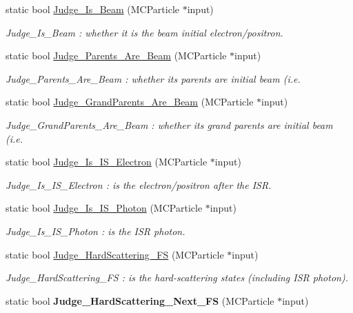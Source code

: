 \begin{DoxyCompactItemize}
\item 
static bool \hyperlink{classToolSet_1_1CMC_aa63f12865d46af350674c7dca3eb5437}{Judge\_\-Is\_\-Beam} (MCParticle $\ast$input)
\begin{DoxyCompactList}\small\item\em Judge\_\-Is\_\-Beam : whether it is the beam initial electron/positron. \item\end{DoxyCompactList}\item 
static bool \hyperlink{classToolSet_1_1CMC_a5ccf3aedd3c942ac6644748abaaf70fe}{Judge\_\-Parents\_\-Are\_\-Beam} (MCParticle $\ast$input)
\begin{DoxyCompactList}\small\item\em Judge\_\-Parents\_\-Are\_\-Beam : whether its parents are initial beam (i.e. \item\end{DoxyCompactList}\item 
static bool \hyperlink{classToolSet_1_1CMC_ad09856f709fff7320c382efd26a408e9}{Judge\_\-GrandParents\_\-Are\_\-Beam} (MCParticle $\ast$input)
\begin{DoxyCompactList}\small\item\em Judge\_\-GrandParents\_\-Are\_\-Beam : whether its grand parents are initial beam (i.e. \item\end{DoxyCompactList}\item 
static bool \hyperlink{classToolSet_1_1CMC_a0630c44bcd0eaf761f4b34e106f2b9d9}{Judge\_\-Is\_\-IS\_\-Electron} (MCParticle $\ast$input)
\begin{DoxyCompactList}\small\item\em Judge\_\-Is\_\-IS\_\-Electron : is the electron/positron after the ISR. \item\end{DoxyCompactList}\item 
static bool \hyperlink{classToolSet_1_1CMC_a688d2854fa645f4c3adad5013f4c9ba2}{Judge\_\-Is\_\-IS\_\-Photon} (MCParticle $\ast$input)
\begin{DoxyCompactList}\small\item\em Judge\_\-Is\_\-IS\_\-Photon : is the ISR photon. \item\end{DoxyCompactList}\item 
static bool \hyperlink{classToolSet_1_1CMC_a85fbb7bf0ef846c3ae1dcfeb27853911}{Judge\_\-HardScattering\_\-FS} (MCParticle $\ast$input)
\begin{DoxyCompactList}\small\item\em Judge\_\-HardScattering\_\-FS : is the hard-\/scattering states (including ISR photon). \item\end{DoxyCompactList}\item 
\hypertarget{classToolSet_1_1CMC_af28ed4c00c5b936aa0660253bd4af35b}{
static bool {\bfseries Judge\_\-HardScattering\_\-Next\_\-FS} (MCParticle $\ast$input)}
\label{classToolSet_1_1CMC_af28ed4c00c5b936aa0660253bd4af35b}


\end{DoxyCompactItemize}

